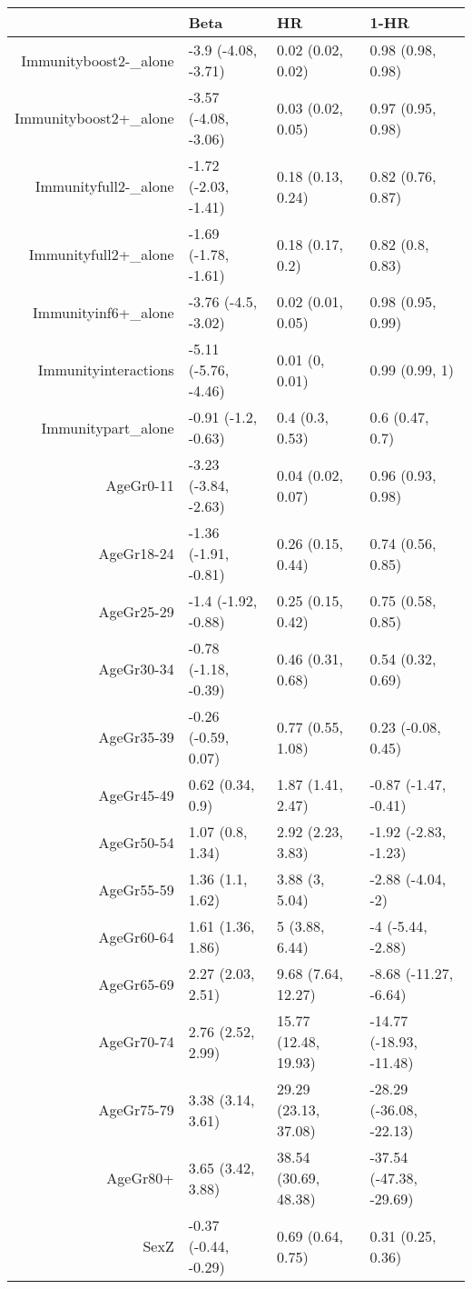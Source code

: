 \begin{table}[ht]
\centering
\begin{tabular}{rlll}
  \hline
 & Beta & HR & 1-HR \\ 
  \hline
Immunityboost2-\_alone & -3.9 (-4.08, -3.71) & 0.02 (0.02, 0.02) & 0.98 (0.98, 0.98) \\ 
  Immunityboost2+\_alone & -3.57 (-4.08, -3.06) & 0.03 (0.02, 0.05) & 0.97 (0.95, 0.98) \\ 
  Immunityfull2-\_alone & -1.72 (-2.03, -1.41) & 0.18 (0.13, 0.24) & 0.82 (0.76, 0.87) \\ 
  Immunityfull2+\_alone & -1.69 (-1.78, -1.61) & 0.18 (0.17, 0.2) & 0.82 (0.8, 0.83) \\ 
  Immunityinf6+\_alone & -3.76 (-4.5, -3.02) & 0.02 (0.01, 0.05) & 0.98 (0.95, 0.99) \\ 
  Immunityinteractions & -5.11 (-5.76, -4.46) & 0.01 (0, 0.01) & 0.99 (0.99, 1) \\ 
  Immunitypart\_alone & -0.91 (-1.2, -0.63) & 0.4 (0.3, 0.53) & 0.6 (0.47, 0.7) \\ 
  AgeGr0-11 & -3.23 (-3.84, -2.63) & 0.04 (0.02, 0.07) & 0.96 (0.93, 0.98) \\ 
  AgeGr18-24 & -1.36 (-1.91, -0.81) & 0.26 (0.15, 0.44) & 0.74 (0.56, 0.85) \\ 
  AgeGr25-29 & -1.4 (-1.92, -0.88) & 0.25 (0.15, 0.42) & 0.75 (0.58, 0.85) \\ 
  AgeGr30-34 & -0.78 (-1.18, -0.39) & 0.46 (0.31, 0.68) & 0.54 (0.32, 0.69) \\ 
  AgeGr35-39 & -0.26 (-0.59, 0.07) & 0.77 (0.55, 1.08) & 0.23 (-0.08, 0.45) \\ 
  AgeGr45-49 & 0.62 (0.34, 0.9) & 1.87 (1.41, 2.47) & -0.87 (-1.47, -0.41) \\ 
  AgeGr50-54 & 1.07 (0.8, 1.34) & 2.92 (2.23, 3.83) & -1.92 (-2.83, -1.23) \\ 
  AgeGr55-59 & 1.36 (1.1, 1.62) & 3.88 (3, 5.04) & -2.88 (-4.04, -2) \\ 
  AgeGr60-64 & 1.61 (1.36, 1.86) & 5 (3.88, 6.44) & -4 (-5.44, -2.88) \\ 
  AgeGr65-69 & 2.27 (2.03, 2.51) & 9.68 (7.64, 12.27) & -8.68 (-11.27, -6.64) \\ 
  AgeGr70-74 & 2.76 (2.52, 2.99) & 15.77 (12.48, 19.93) & -14.77 (-18.93, -11.48) \\ 
  AgeGr75-79 & 3.38 (3.14, 3.61) & 29.29 (23.13, 37.08) & -28.29 (-36.08, -22.13) \\ 
  AgeGr80+ & 3.65 (3.42, 3.88) & 38.54 (30.69, 48.38) & -37.54 (-47.38, -29.69) \\ 
  SexZ & -0.37 (-0.44, -0.29) & 0.69 (0.64, 0.75) & 0.31 (0.25, 0.36) \\ 
   \hline
\end{tabular}
\end{table}
